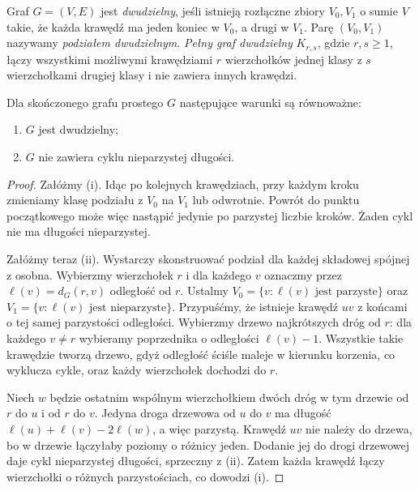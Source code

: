\begin{definicja}
Graf $G=(V,E)$ jest \emph{dwudzielny}, jeśli istnieją
rozłączne zbiory $V_0,V_1$ o sumie $V$ takie, że
każda krawędź ma jeden koniec w $V_0$, a drugi
w $V_1$. Parę $(V_0,V_1)$ nazywamy \emph{podziałem
dwudzielnym}. \emph{Pełny graf dwudzielny} $K_{r,s}$,
gdzie $r,s\ge1$, łączy wszystkimi możliwymi krawędziami
$r$ wierzchołków jednej klasy z $s$ wierzchołkami
drugiej klasy i nie zawiera innych krawędzi.
\end{definicja}

\begin{twierdzenie}
Dla skończonego grafu prostego $G$ następujące
warunki są równoważne:
\begin{enumerate}[label=(\roman*)]
\item $G$ jest dwudzielny;
\item $G$ nie zawiera cyklu nieparzystej długości.
\end{enumerate}
\end{twierdzenie}

\begin{proof}
Załóżmy (i). Idąc po kolejnych krawędziach, przy
każdym kroku zmieniamy klasę podziału z $V_0$ na
$V_1$ lub odwrotnie. Powrót do punktu początkowego
może więc nastąpić jedynie po parzystej liczbie
kroków. Żaden cykl nie ma długości nieparzystej.

Załóżmy teraz (ii). Wystarczy skonstruować podział
dla każdej składowej spójnej z osobna. Wybierzmy
wierzchołek $r$ i dla każdego $v$ oznaczmy przez
$\ell(v)=d_G(r,v)$ odległość od $r$. Ustalmy
$V_0=\{v:\ell(v)\text{ jest parzyste}\}$
oraz $V_1=\{v:\ell(v)\text{ jest nieparzyste}\}$.
Przypuśćmy, że istnieje krawędź $uv$ z końcami
o tej samej parzystości odległości. Wybierzmy
drzewo najkrótszych dróg od $r$: dla każdego
$v\ne r$ wybieramy poprzednika o odległości
$\ell(v)-1$. Wszystkie takie krawędzie tworzą
drzewo, gdyż odległość ściśle maleje w kierunku
korzenia, co wyklucza cykle, oraz każdy wierzchołek
dochodzi do $r$.

Niech $w$ będzie ostatnim wspólnym wierzchołkiem
dwóch dróg w tym drzewie od $r$ do $u$ i od $r$
do $v$. Jedyna droga drzewowa od $u$ do $v$
ma długość $\ell(u)+\ell(v)-2\ell(w)$, a więc
parzystą. Krawędź $uv$ nie należy do drzewa,
bo w drzewie łączyłaby poziomy o różnicy jeden.
Dodanie jej do drogi drzewowej daje cykl
nieparzystej długości, sprzeczny z (ii).
Zatem każda krawędź łączy wierzchołki o
różnych parzystościach, co dowodzi (i).
\end{proof}

